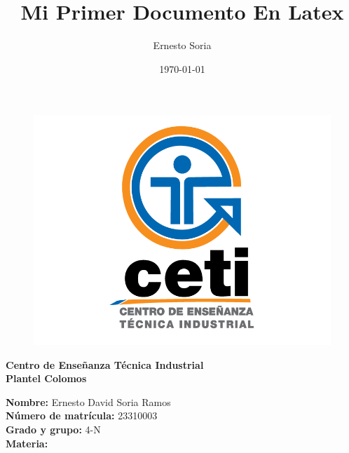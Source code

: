\documentclass{article}
\title{\Huge \bfseries Mi Primer Documento En Latex}
\author{Ernesto Soria}
\date{\today} %
\begin{document}
	
	\maketitle %
	
	
	
	
	\begin{figure}[h] %
		\centering
		\includegraphics[width=1\textwidth]{cetilogo.png} %
		\label{fig:ceti} %
	\end{figure}
	
	\begin{center}
		{\LARGE \textbf{Centro de Enseñanza Técnica Industrial}} \\[2.5mm]
		{\LARGE \textbf{Plantel Colomos}}\\
	\end{center}
	
	\vspace{5mm} %
	
	\begin{flushleft}
		{\large \textbf{Nombre:} Ernesto David Soria Ramos} \\[2mm]
		{\large \textbf{Número de matrícula:} 23310003} \\[2mm]
		{\large \textbf{Grado y grupo:} 4-N}\\[2mm]
		{\large \textbf{Materia:} }\\[2mm]
	\end{flushleft}
	
	\newpage
	
	
	
	
	
	
\end{document}
